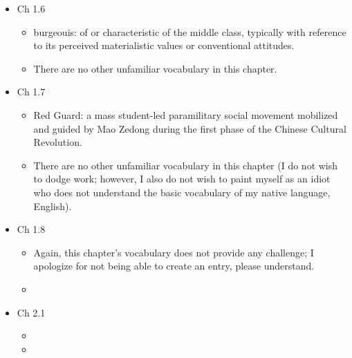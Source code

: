\documentclass[12pt]{article}
\newcommand{\vc}[4]{
  \item Ch #1.#2
  \begin{itemize}
    \item #3
    \item #4
  \end{itemize}
}
\begin{document}
\begin{itemize}
  \vc{1}{6}{burgeouis: of or characteristic of the middle class, typically with reference to its perceived materialistic values or conventional attitudes.}{There are no other unfamiliar vocabulary in this chapter.}

  \vc{1}{7}{Red Guard: a mass student-led paramilitary social movement mobilized and guided by Mao Zedong during the first phase of the Chinese Cultural Revolution.}{There are no other unfamiliar vocabulary in this chapter (I do not wish to dodge work; however, I also do not wish to paint myself as an idiot who does not understand the basic vocabulary of my native language, English).}

  \vc{1}{8}{Again, this chapter's vocabulary does not provide any challenge; I apologize for not being able to create an entry, please understand.}{}

  \vc{2}{1}{}{}
\end{itemize}
\end{document}
